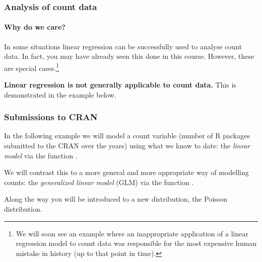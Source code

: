 \documentclass{beamer}\usepackage[]{graphicx}\usepackage[]{xcolor}
\begin{document}
\begin{frame}[fragile]
\frametitle{Analysis of count data}
\framesubtitle{Why do we care?}

In some situations linear regression can be successfully used to analyse count data. In fact, you may have already seen this done in this course. However, these are special cases.\footnote{We will soon see an example where an inappropriate application of a linear regression model to count data was responsible for the most expensive human mistake in history (up to that point in time).}
\bigskip \bigskip

{\bf Linear regression is not generally applicable to count data.} This is demonstrated in the example below.
\end{frame}





\begin{frame}[fragile]
\frametitle{Submissions to CRAN}
In the following example we will model a count variable (number of R packages submitted to the CRAN over the years) using what we know to date: the {\em linear model} via the function . 
\bigskip

We will contrast this to a more general and more appropriate way of modelling counts: the {\em generalized linear model} (GLM) via the function .
\bigskip

Along the way you will be introduced to a new distribution, the Poisson distribution.

\end{frame}
\end{document}
